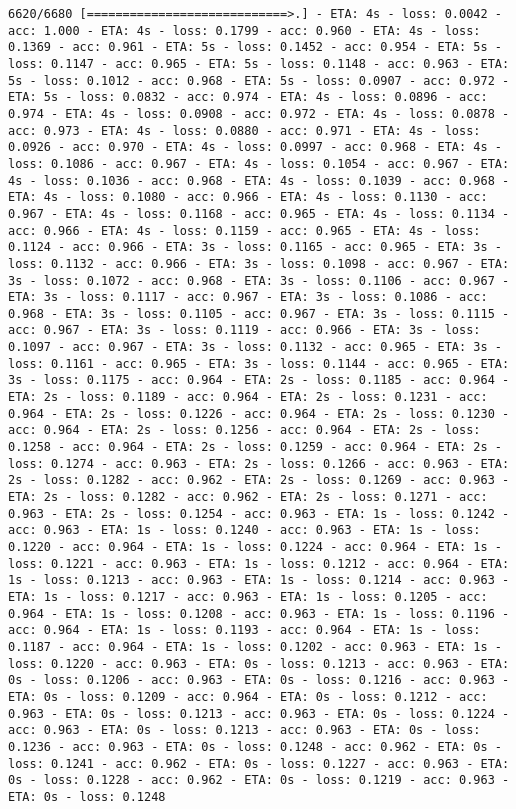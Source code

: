 \documentclass[11pt]{article}
\begin{document}
\begin{Verbatim}[commandchars=\\\{\}]
6620/6680 [============================>.] - ETA: 4s - loss: 0.0042 - acc: 1.000 - ETA: 4s - loss: 0.1799 - acc: 0.960 - ETA: 4s - loss: 0.1369 - acc: 0.961 - ETA: 5s - loss: 0.1452 - acc: 0.954 - ETA: 5s - loss: 0.1147 - acc: 0.965 - ETA: 5s - loss: 0.1148 - acc: 0.963 - ETA: 5s - loss: 0.1012 - acc: 0.968 - ETA: 5s - loss: 0.0907 - acc: 0.972 - ETA: 5s - loss: 0.0832 - acc: 0.974 - ETA: 4s - loss: 0.0896 - acc: 0.974 - ETA: 4s - loss: 0.0908 - acc: 0.972 - ETA: 4s - loss: 0.0878 - acc: 0.973 - ETA: 4s - loss: 0.0880 - acc: 0.971 - ETA: 4s - loss: 0.0926 - acc: 0.970 - ETA: 4s - loss: 0.0997 - acc: 0.968 - ETA: 4s - loss: 0.1086 - acc: 0.967 - ETA: 4s - loss: 0.1054 - acc: 0.967 - ETA: 4s - loss: 0.1036 - acc: 0.968 - ETA: 4s - loss: 0.1039 - acc: 0.968 - ETA: 4s - loss: 0.1080 - acc: 0.966 - ETA: 4s - loss: 0.1130 - acc: 0.967 - ETA: 4s - loss: 0.1168 - acc: 0.965 - ETA: 4s - loss: 0.1134 - acc: 0.966 - ETA: 4s - loss: 0.1159 - acc: 0.965 - ETA: 4s - loss: 0.1124 - acc: 0.966 - ETA: 3s - loss: 0.1165 - acc: 0.965 - ETA: 3s - loss: 0.1132 - acc: 0.966 - ETA: 3s - loss: 0.1098 - acc: 0.967 - ETA: 3s - loss: 0.1072 - acc: 0.968 - ETA: 3s - loss: 0.1106 - acc: 0.967 - ETA: 3s - loss: 0.1117 - acc: 0.967 - ETA: 3s - loss: 0.1086 - acc: 0.968 - ETA: 3s - loss: 0.1105 - acc: 0.967 - ETA: 3s - loss: 0.1115 - acc: 0.967 - ETA: 3s - loss: 0.1119 - acc: 0.966 - ETA: 3s - loss: 0.1097 - acc: 0.967 - ETA: 3s - loss: 0.1132 - acc: 0.965 - ETA: 3s - loss: 0.1161 - acc: 0.965 - ETA: 3s - loss: 0.1144 - acc: 0.965 - ETA: 3s - loss: 0.1175 - acc: 0.964 - ETA: 2s - loss: 0.1185 - acc: 0.964 - ETA: 2s - loss: 0.1189 - acc: 0.964 - ETA: 2s - loss: 0.1231 - acc: 0.964 - ETA: 2s - loss: 0.1226 - acc: 0.964 - ETA: 2s - loss: 0.1230 - acc: 0.964 - ETA: 2s - loss: 0.1256 - acc: 0.964 - ETA: 2s - loss: 0.1258 - acc: 0.964 - ETA: 2s - loss: 0.1259 - acc: 0.964 - ETA: 2s - loss: 0.1274 - acc: 0.963 - ETA: 2s - loss: 0.1266 - acc: 0.963 - ETA: 2s - loss: 0.1282 - acc: 0.962 - ETA: 2s - loss: 0.1269 - acc: 0.963 - ETA: 2s - loss: 0.1282 - acc: 0.962 - ETA: 2s - loss: 0.1271 - acc: 0.963 - ETA: 2s - loss: 0.1254 - acc: 0.963 - ETA: 1s - loss: 0.1242 - acc: 0.963 - ETA: 1s - loss: 0.1240 - acc: 0.963 - ETA: 1s - loss: 0.1220 - acc: 0.964 - ETA: 1s - loss: 0.1224 - acc: 0.964 - ETA: 1s - loss: 0.1221 - acc: 0.963 - ETA: 1s - loss: 0.1212 - acc: 0.964 - ETA: 1s - loss: 0.1213 - acc: 0.963 - ETA: 1s - loss: 0.1214 - acc: 0.963 - ETA: 1s - loss: 0.1217 - acc: 0.963 - ETA: 1s - loss: 0.1205 - acc: 0.964 - ETA: 1s - loss: 0.1208 - acc: 0.963 - ETA: 1s - loss: 0.1196 - acc: 0.964 - ETA: 1s - loss: 0.1193 - acc: 0.964 - ETA: 1s - loss: 0.1187 - acc: 0.964 - ETA: 1s - loss: 0.1202 - acc: 0.963 - ETA: 1s - loss: 0.1220 - acc: 0.963 - ETA: 0s - loss: 0.1213 - acc: 0.963 - ETA: 0s - loss: 0.1206 - acc: 0.963 - ETA: 0s - loss: 0.1216 - acc: 0.963 - ETA: 0s - loss: 0.1209 - acc: 0.964 - ETA: 0s - loss: 0.1212 - acc: 0.963 - ETA: 0s - loss: 0.1213 - acc: 0.963 - ETA: 0s - loss: 0.1224 - acc: 0.963 - ETA: 0s - loss: 0.1213 - acc: 0.963 - ETA: 0s - loss: 0.1236 - acc: 0.963 - ETA: 0s - loss: 0.1248 - acc: 0.962 - ETA: 0s - loss: 0.1241 - acc: 0.962 - ETA: 0s - loss: 0.1227 - acc: 0.963 - ETA: 0s - loss: 0.1228 - acc: 0.962 - ETA: 0s - loss: 0.1219 - acc: 0.963 - ETA: 0s - loss: 0.1248 
\end{Verbatim}
\end{document}
